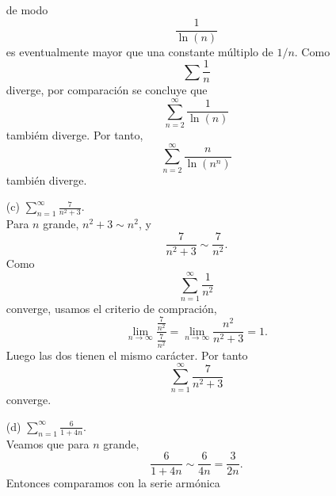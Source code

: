 \documentclass[12pt,a4paper]{article}
\begin{document}
\begin{solucion}
\begin{enumerate}
\begin{equation*}
            \end{equation*}
            de modo
            \begin{equation*}
                \frac{1}{\ln(n)}
            \end{equation*}
            es eventualmente mayor que una constante múltiplo de $1/n$. Como
            \begin{equation*}
                \sum\frac{1}{n}
            \end{equation*}
            diverge, por comparación se concluye que
            \begin{equation*}
                \sum_{n=2}^{\infty}\frac{1}{\ln(n)}
            \end{equation*}
            tambiém diverge. Por tanto,
            \begin{equation*}
                \sum_{n=2}^{\infty}\frac{n}{\ln(n^{n})}
            \end{equation*}
            también diverge.
            \item[(c)] $\sum_{n=1}^{\infty}\frac{7}{n^{2}+3}$.\\
            Para $n$ grande, $n^{2}+3\sim n^{2}$, y
            \begin{equation*}
                \frac{7}{n^{2}+3}\sim\frac{7}{n^{2}}.
            \end{equation*}
            Como
            \begin{equation*}
                \sum_{n=1}^{\infty}\frac{1}{n^{2}}
            \end{equation*}
            converge, usamos el criterio de compración,
            \begin{equation*}
                \lim_{n\to\infty}\frac{\frac{7}{n^{2}}}{\frac{7}{n^{2}}}=\lim_{n\to\infty}\frac{n^{2}}{n^{2}+3}=1.
            \end{equation*}
            Luego las dos tienen el mismo carácter. Por tanto
            \begin{equation*}
                \sum_{n=1}^{\infty}\frac{7}{n^{2}+3}
            \end{equation*}
            converge.
            \item[(d)] $\sum_{n=1}^{\infty}\frac{6}{1+4n}$.\\
            Veamos que para $n$ grande,
            \begin{equation*}
                \frac{6}{1+4n}\sim\frac{6}{4n}=\frac{3}{2n}.
            \end{equation*}
            Entonces comparamos con la serie armónica

\end{enumerate}
\end{solucion}
\end{document}
